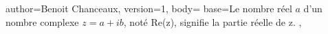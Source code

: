 {
author={Benoit Chanceaux},
version={1},
body={
base={Le nombre réel {{{$a$}}} d’un nombre complexe ${{{z}}} = {{{a}}} + {{{i}}} {{{b}}}$, noté Re({{{z}}}), signifie la partie réelle de {{{z.}}}}
},
}